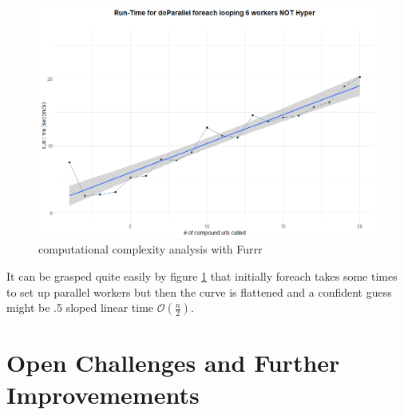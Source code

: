 \documentclass[
  12pt,
  a4paper,
  oneside]{book}
\theoremstyle{definition}
\theoremstyle{definition}
\theoremstyle{definition}
\theoremstyle{remark}
\begin{document}
\begin{figure}
\centering
\includegraphics{images/forerach.png}
\caption{\label{fig:foreach}computational complexity analysis with Furrr}
\end{figure}

It can be grasped quite easily by figure \ref{fig:foreach} that initially foreach takes some times to set up parallel workers but then the curve is flattened and a confident guess might be .5 sloped linear time \(\mathcal{O}(\frac{n}{2})\).

\hypertarget{challenges}{%
\section{Open Challenges and Further Improvemements}\label{challenges}}
\end{document}
